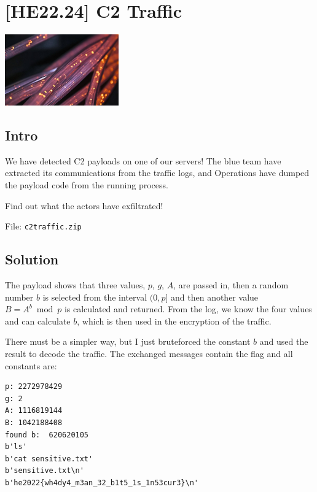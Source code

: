 
\hypertarget{he22.24}{%
\chapter{[HE22.24] C2 Traffic}\label{he22.24}}

\begin{marginfigure}
	\includegraphics[width=49mm]{level6/challenge24.jpg}
\end{marginfigure}
\section{Intro}
We have detected C2 payloads on one of our servers! The blue team have
extracted its communications from the traffic logs, and Operations have dumped
the payload code from the running process.

Find out what the actors have exfiltrated!

File: \verb+c2traffic.zip+

\section{Solution}\label{hv22.24solution}

The payload shows that three values, $p$, $g$, $A$, are passed in, then a
random number $b$ is selected from the interval $(0,p]$ and then another value
$B = A^b \bmod p$ is calculated and returned.  From the log, we know the four
values and can calculate $b$, which is then used in the encryption of the
traffic.

There must be a simpler way, but I just bruteforced the constant $b$ and used
the result to decode the traffic.  The exchanged messages contain the flag and
all constants are:

\begin{verbatim}
p: 2272978429
g: 2
A: 1116819144
B: 1042188408
found b:  620620105
b'ls'
b'cat sensitive.txt'
b'sensitive.txt\n'
b'he2022{wh4dy4_m3an_32_b1t5_1s_1n53cur3}\n'
\end{verbatim}



	









